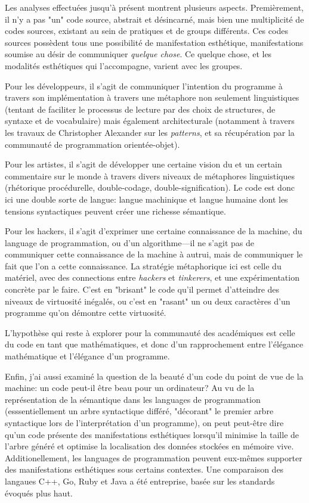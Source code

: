 \documentclass{article}
\begin{document}
Les analyses effectuées jusqu'à présent montrent plusieurs aspects. Premièrement, il n'y a pas "un" code source, abstrait et désincarné, mais bien une multiplicité de codes sources, existant au sein de pratiques et de groups différents. Ces codes sources possèdent tous une possibilité de manifestation esthétique, manifestations soumise au désir de communiquer \emph{quelque chose}. Ce quelque chose, et les modalités esthétiques qui l'accompagne, varient avec les groupes.

Pour les développeurs, il s'agit de communiquer l'intention du programme à travers son implémentation à travers une métaphore non seulement linguistiques (tentant de faciliter le processus de lecture par des choix de structures, de syntaxe et de vocabulaire) mais également architecturale (notamment à travers les travaux de Christopher Alexander sur les \emph{patterns}, et sa récupération par la communauté de programmation orientée-objet).

Pour les artistes, il s'agit de développer une certaine vision du et un certain commentaire sur le monde à travers divers niveaux de métaphores linguistiques (rhétorique procédurelle\cite{bogost_rhetoric_2007}, double-codage\cite{cox_speaking_2013}, double-signification\cite{paloque-berges_poetique_2009}). Le code est donc ici une double sorte de langue: langue machinique et langue humaine dont les tensions syntactiques peuvent créer une richesse sémantique.

Pour les hackers, il s'agit d'exprimer une certaine connaissance de la machine, du language de programmation, ou d'un algorithme—il ne s'agit pas de communiquer cette connaissance de la machine à autrui, mais de communiquer le fait que l'on a cette connaissance. La stratégie métaphorique ici est celle du matériel, avec des connections entre \emph{hackers} et \emph{tinkerers}, et une expérimentation concrète par le faire. C'est en "brisant" le code qu'il permet d'atteindre des niveaux de virtuosité inégalés, ou c'est en "rasant" un ou deux caractères d'un programme qu'on démontre cette virtuosité.

L'hypothèse qui reste à explorer pour la communauté des académiques est celle du code en tant que mathématiques, et donc d'un rapprochement entre l'élégance mathématique et l'élégance d'un programme.

Enfin, j'ai aussi examiné la question de la beauté d'un code du point de vue de la machine: un code peut-il être beau pour un ordinateur? Au vu de la représentation de la sémantique dans les languages de programmation (esssentiellement un arbre syntactique différé, "décorant" le premier arbre syntactique lors de l'interprétation d'un programme), on peut peut-être dire qu'un code présente des manifestations esthétiques lorsqu'il minimise la taille de l'arbre généré et optimise la localisation des données stockées en mémoire vive. Additionellement, les languages de programmation peuvent eux-mêmes supporter des manifestations esthétiques sous certains contextes. Une comparaison des langaues C++, Go, Ruby et Java a été entreprise, basée sur les standards évoqués plus haut.
\end{document}
